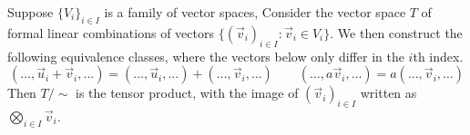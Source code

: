 \begin{theorem}
    Suppose \({\{V_i\}}_{i \in I}\) is a family of vector spaces,
    Consider the vector space \(T\) of formal linear combinations of vectors
    \({\{{(\vec{v}_i)}_{i \in I} : \vec{v}_i \in V_i\}}\).
    We then construct the following equivalence classes,
    where the vectors below only differ in the \(i\)th index.
    \begin{equation*}
        (\hdots,\vec{u}_i+\vec{v}_i,\hdots) = (\hdots,\vec{u}_i,\hdots) + (\hdots,\vec{v}_i,\hdots) \qquad
        (\hdots,a\vec{v}_i,\hdots) = a(\hdots,\vec{v}_i,\hdots)
    \end{equation*}
    Then \(T/{\sim}\) is the tensor product,
    with the image of \({(\vec{v}_i)}_{i \in I}\) written as \(\bigotimes_{i \in I} \vec{v}_i\).
\end{theorem}
